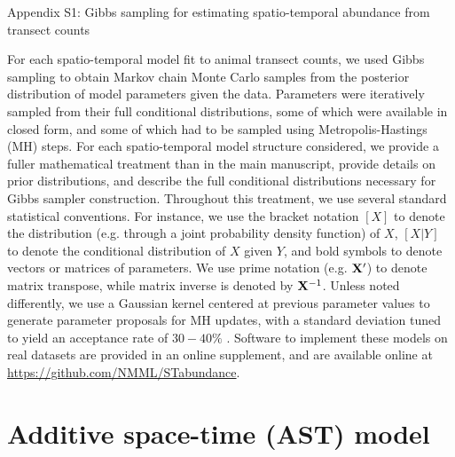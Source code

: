 \documentclass[12pt,fleqn]{article}
\begin{document}
\rm \begin{flushleft}

\raggedbottom
\vspace{.5in}

\begin{center}
Appendix S1: Gibbs sampling for estimating spatio-temporal abundance from transect counts
\bigskip
\end{center}
\vspace{.3in}

\doublespacing
For each spatio-temporal model fit to animal transect counts, we used Gibbs sampling \citep[see e.g.][]{GelmanEtAl2004} to obtain Markov chain Monte Carlo samples from the posterior distribution of model parameters given the data.  Parameters were iteratively sampled from their full conditional distributions, some of
which were available in closed form, and some of which had to be sampled using Metropolis-Hastings (MH) steps.  For each spatio-temporal model structure considered, we provide a fuller mathematical treatment than in the main manuscript, provide details on prior distributions, and describe the full conditional distributions necessary for Gibbs sampler construction.  Throughout this treatment, we use several standard statistical conventions.  For instance, we use the bracket notation $[X]$ to denote the distribution (e.g. through a joint probability density function) of $X$, $[X|Y]$ to denote the conditional distribution of $X$ given $Y$, and bold symbols to denote vectors or matrices of parameters. We use prime notation (e.g. ${\bf X}^\prime$) to denote matrix transpose, while matrix inverse is denoted by ${\bf X}^{-1}$. Unless noted differently, we use a Gaussian kernel centered at previous parameter values to generate parameter proposals for MH updates, with a standard deviation tuned to yield an acceptance rate of $30-40\%$ \citep{GelmanEtAl2004}.  Software to implement these models on real datasets are provided in an online supplement, and are available online at \url{https://github.com/NMML/STabundance}.

\section{Additive space-time (AST) model}


\end{flushleft}
\end{document}
